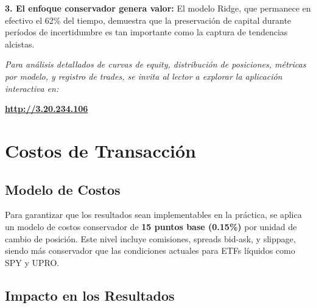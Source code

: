 \documentclass[11pt,a4paper]{article}
\begin{document}
\textbf{3. El enfoque conservador genera valor:} El modelo Ridge, que permanece en efectivo el 62\% del tiempo, demuestra que la preservación de capital durante períodos de incertidumbre es tan importante como la captura de tendencias alcistas.

\vspace{0.5cm}

\begin{center}
\textit{Para análisis detallados de curvas de equity, distribución de posiciones, métricas por modelo, y registro de trades, se invita al lector a explorar la aplicación interactiva en:}

\vspace{0.3cm}

\textbf{\url{http://3.20.234.106}}
\end{center}






\section{Costos de Transacción}

\subsection{Modelo de Costos}

Para garantizar que los resultados sean implementables en la práctica, se aplica un modelo de costos conservador de \textbf{15 puntos base (0.15\%)} por unidad de cambio de posición. Este nivel incluye comisiones, spreads bid-ask, y slippage, siendo más conservador que las condiciones actuales para ETFs líquidos como SPY y UPRO.

\subsection{Impacto en los Resultados}
\end{document}
